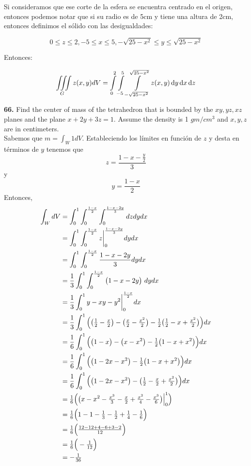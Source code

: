 \documentclass[11pt]{report}
\begin{document}
Si consideramos que ese corte de la esfera se encuentra centrado en el origen,
entonces podemos notar que si su radio es de 5cm y tiene una altura de 2cm,
entonces definimos el sólido con las desigualdades:

\[ 0 \leq z \leq 2, -5 \leq x \leq 5, - \sqrt{25 - x^2} \leq y \leq \sqrt{25 - x^2}\]

Entonces:

\[ \iiint \limits_G z(x,y) dV = \int \limits_0^2 \int \limits_{-5}^5
        \int \limits_{- \sqrt{25 - x^2}}^{\sqrt{25 - x^2}} z(x,y) \, \text dy \, \text dx \, \text dz  \]


\textbf{66.} Find the center of mass of the tetrahedron that is bounded by the
$xy, yz, xz$ planes and the plane $x + 2y + 3z = 1$. Assume the density is
1 $gm/cm^3$ and $x, y, z$ are in centimeters. \\
Sabemos que $m = \int_W 1dV$. Estableciendo los límites en función de $z$ y desta en
términos de $y$
tenemos que
$$z=\frac{1-x-\tfrac{y}{2}}{3}$$ y
$$y=\frac{1-x}{2}$$
Entonces,
\begin{equation}
	\begin{split}
		\int_WdV&=\int_0^1\tsint{\frac{1-x}{2}}\tsint{\frac{1-x-2y}{3}}dzdydx\\
			    &=\int_0^1\tsint{\frac{1-x}{2}}z\bigg|_0^{\frac{1-x-2y}{3}}dydx\\
				&=\int_0^1\tsint{\frac{1-x}{2}}\frac{1-x-2y}{3}dydx\\
				&=\frac{1}{3}\int_0^1\tsint{\frac{1-x}{2}}\bp{1-x-2y}\ dydx\\
				&=\frac{1}{3}\int_0^1y-xy-y^2\bigg|_0^{\frac{1-x}{2}}dx\\
				&=\frac{1}{3}\int_0^1\Bp{\bp{\tfrac{1}{2}-\tfrac{x}{2}}-\bp{\tfrac{x}{2}
					-\tfrac{x^2}{2}}-\tfrac{1}{2}\bp{\tfrac{1}{2}-x+\tfrac{x^2}{2}}}dx\\
				&=\frac{1}{6}\int_0^1\Bp{\bp{1-x}-\bp{x-x^2}-\tfrac{1}{2}\bp{1-x+x^2}}dx\\
				&=\frac{1}{6}\int_0^1\Bp{\bp{1-2x-x^2}-\tfrac{1}{2}\bp{1-x+x^2}}dx\\
				&=\frac{1}{6}\int_0^1\Bp{\bp{1-2x-x^2}-\bp{\tfrac{1}{2}-\tfrac{x}{2}+\tfrac{x^2}{2}}}dx\\
				&=\tfrac{1}{6}\Bp{\bp{x-x^2-\tfrac{x^3}{3}-\tfrac{x}{2}+\tfrac{x^2}{4}
					-\tfrac{x^3}{6}}\Big|_0^1}\\
				&=\tfrac{1}{6}\Bp{1-1-\tfrac{1}{3}-\tfrac{1}{2}+\tfrac{1}{4}-\tfrac{1}{6}}\\
				&=\tfrac{1}{6}\Bp{\tfrac{12-12+4-6+3-2}{12}}\\
				&=\tfrac{1}{6}\Bp{-\tfrac{1}{12}}\\
				&=-\tfrac{1}{36}\\
	\end{split}
\end{equation}
\end{document}
